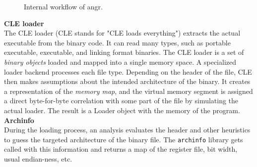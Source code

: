 \documentclass[seminar]{plai}
\begin{document}
\begin{figure}[H]
\centering
{}
\caption{Internal workflow of angr.\cite{angr-internals}}
\label{fig:angr-flow}
\end{figure}

\noindent\textbf{CLE loader}\\
The CLE loader (CLE stands for "CLE loads everything") extracts the actual executable from the binary code. It can read many types, such as portable executable, executable, and linking format binaries.
The CLE loader is a set of \textit{binary objects} loaded and mapped into a single memory space. A specialized loader backend processes each file type. Depending on the header of the file, CLE then makes assumptions about the intended architecture of the binary. It creates a representation of the \textit{memory map}, and the virtual memory segment is assigned a direct byte-for-byte correlation with some part of the file by simulating the actual loader. The result is a Loader object with the memory of the program.\cite{loading-a-binary}\\

\textbf{Archinfo}\\
During the loading process, an analysis evaluates the header and other heuristics to guess the targeted architecture of the binary file. The \texttt{archinfo} library gets called with this information and returns a map of the register file, bit width, usual endian-ness, etc.\\
\end{document}
